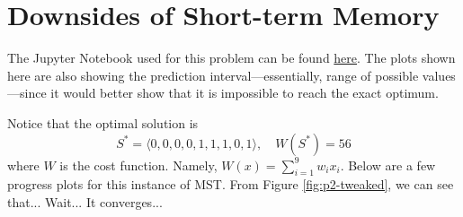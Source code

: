 \section{Downsides of Short-term Memory}

The Jupyter Notebook used for this problem can be found \href{https://github.com/nngerncham/ma395_heuristic/blob/main/homework/hw3/codebase/Notebooks/Problem\%202.ipynb}{here}. The plots shown here are also showing the prediction interval---essentially, range of possible values---since it would better show that it is impossible to reach the exact optimum.

Notice that the optimal solution is
\[
    S^* = \langle 0, 0, 0, 0, 1, 1, 1, 0, 1 \rangle,\quad W(S^*) = 56
\]
where \(W\) is the cost function. Namely, \(W(x) = \sum_{i=1}^9 w_i x_i\). Below are a few progress plots for this instance of MST. From Figure \ref{fig:p2-tweaked}, we can see that... Wait... It converges...

